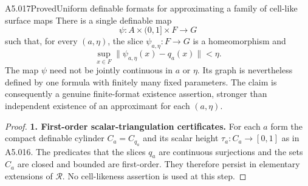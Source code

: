 \begin{saresult}{A5.017}{Proved}{Uniform definable formats for approximating a family of cell-like surface maps}
There is a single definable map
\[
 \psi:A\times(0,1]\times F\longrightarrow G
 \tag{A5.17.1}
\]
such that, for every $(a,\eta)$, the slice $\psi_{a,\eta}:F\to G$ is a
homeomorphism and
\[
 \sup_{x\in F}\|\psi_{a,\eta}(x)-q_a(x)\|<\eta.
 \tag{A5.17.2}
\]
The map $\psi$ need not be jointly continuous in $a$ or $\eta$. Its graph
is nevertheless defined by one formula with finitely many fixed parameters.
The claim is consequently a genuine finite-format existence assertion,
stronger than independent existence of an approximant for each $(a,\eta)$.

\end{saresult}
\begin{proof}
\textbf{1. First-order scalar-triangulation certificates.}
For each $a$ form the compact definable cylinder $C_a=C_{q_a}$ and its scalar
height $\tau_a:C_a\to[0,1]$ as in A5.016. The predicates that the slices
$q_a$ are continuous surjections and the sets $C_a$ are closed and bounded
are first-order. They therefore persist in elementary extensions of
$\mathcal R$. No cell-likeness assertion is used at this step.


\end{proof}
